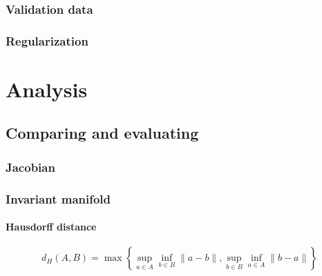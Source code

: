\documentclass{article}
\theoremstyle{definition} \newtheorem{definition}{Definition}  \newtheorem{example}{Example}
\theoremstyle{remark} \newtheorem{remark}{Remark}
\newcounter{ct}
\begin{document}
\subsubsection{Validation data}

\subsubsection{Regularization}

\newpage
\section{Analysis}
\subsection{Comparing and evaluating}

\subsubsection{Jacobian}


\subsubsection{Invariant manifold}
\paragraph{Hausdorff distance}
\[
d_H(A, B) = \max\left\{ \sup_{a \in A} \inf_{b \in B} \|a - b\|, \sup_{b \in B} \inf_{a \in A} \|b - a\| \right\}
\]


\newpage
\end{document}
